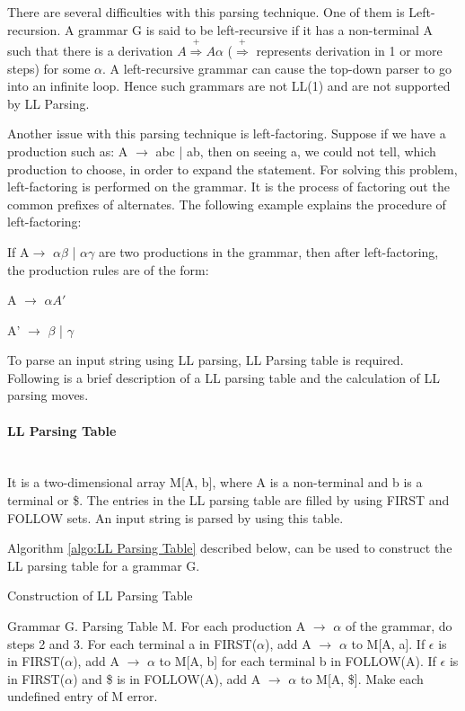 There are several difficulties with this parsing technique. One of them is Left-recursion. A grammar G is said to be left-recursive if it has a non-terminal A such that there is a derivation $A\overset{+}{\Rightarrow}A\alpha$ ($\overset{+}{\Rightarrow}$ represents derivation in 1 or more steps) for some $\alpha$. A left-recursive grammar can cause the top-down parser to go into an infinite loop. Hence such grammars are not LL(1) and are not supported by LL Parsing.

Another issue with this parsing technique is left-factoring. Suppose if we have a production such as: A $\to$ abc | ab, then on seeing a, we could not tell, which production to choose, in order to expand the statement. For solving this problem, left-factoring is performed on the grammar. It is the process of factoring out the common prefixes of alternates. The following example explains the procedure of left-factoring:
\begin{example}
If A$\to$ $\alpha\beta$ | $\alpha\gamma$ are two productions in the grammar, then after left-factoring, the production rules are of the form:

A $\to$ $\alpha A'$

A' $\to$ $\beta$ | $\gamma$
\end{example}
To parse an input string using LL parsing, LL Parsing table is required. Following is a brief description of a LL parsing table and the calculation of LL parsing moves.

\paragraph{LL Parsing Table}\mbox{}\\
\label{para: LL Paring Table}
It is a two-dimensional array M[A, b], where A is a non-terminal and b is a terminal or \$. The entries in the LL parsing table are filled by using FIRST and FOLLOW sets. An input string is parsed by using this table.

Algorithm \ref{algo:LL Parsing Table} described below, can be used to construct the LL parsing table for a grammar G.
\begin{algorithm}
\caption{Construction of LL Parsing Table}
\label{algo:LL Parsing Table}

\begin{algorithmic}[1]
\Require Grammar G.
\Ensure Parsing Table M.
\State For each production A $\to$ $\alpha$ of the grammar, do steps 2 and 3.
\State For each terminal a in FIRST($\alpha$), add A $\to$ $\alpha$ to M[A, a].
\State If $\epsilon$ is in FIRST($\alpha$), add A $\to$ $\alpha$ to M[A, b] for each terminal b in FOLLOW(A). If $\epsilon$ is in FIRST($\alpha$) and \$ is in FOLLOW(A), add A $\to$ $\alpha$ to M[A, \$].
\State Make each undefined entry of M error.
\end{algorithmic}
\end{algorithm}

